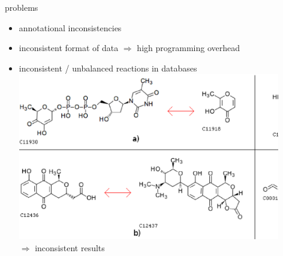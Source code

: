 \documentclass[style=ufz]{powerdot}
\newcommand{\magic}{transmutational} %
\newcommand{\indistinct}{indistinct}
\begin{document}
\begin{slide}{problems}
\begin{itemize}
  \item annotational inconsistencies\newline\pause
  \item inconsistent format of data \pause$\Rightarrow$ high programming overhead\newline\pause
  \item inconsistent / unbalanced reactions in databases\newline \\
  \includegraphics[width=0.9\textwidth]{examples.ps}\\ \pause
  $\Rightarrow$ inconsistent results
\end{itemize}
\end{slide}
\newcommand{\fordataset}{\foreach \Num/\description/\color/\pattern in {
	\the\lastbalanced / balanced \\	reactions:\\	/green/north east lines,
	 \the\lastindistinctive / \indistinct\ reactions:\\/yellow/north west lines,
	\the\lastunbalanced / unbalanced\slash\magic\\reactions:/orange/dots,
	 \the\lastmagic / \magic \\reactions:		/red/vertical lines}
}
\end{document}
